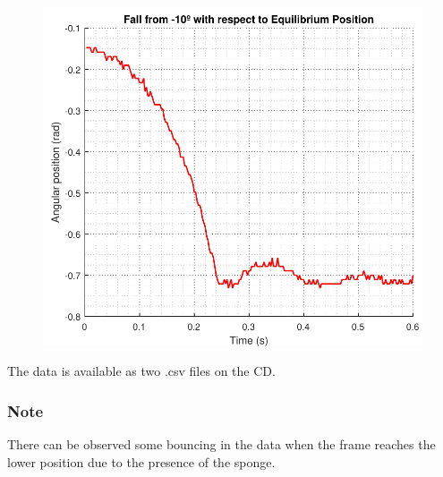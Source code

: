 \begin{minipage}{\linewidth}
\begin{minipage}{0.45\linewidth}
\begin{figure}[H]
			\includegraphics[scale=.53]{figures/tenDegFallRad}
			\centering
			\vspace{-.4cm}
			\captionsetup{justification=centering}
			\label{tenDegFallRad}
		\end{figure}\vspace{-5mm}
	\end{minipage}
\end{minipage} 

The data is available as two .csv files on the CD.

%
%
%

\subsubsection{Note}
 There can be observed some bouncing in the data when the frame reaches the lower position due to the presence of the sponge.
